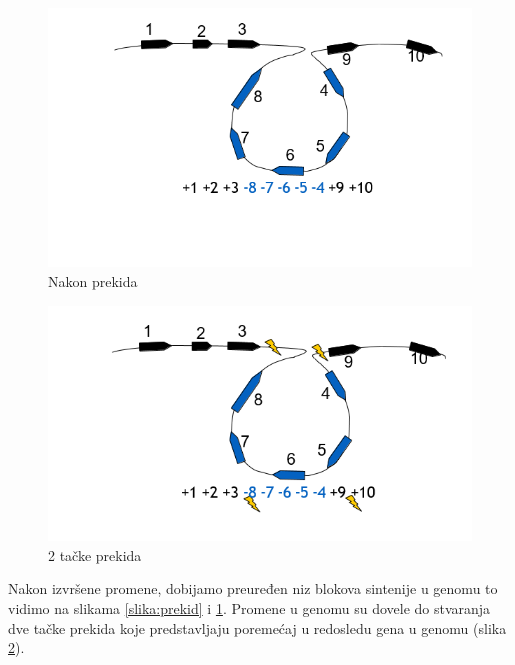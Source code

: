 \begin{minipage}{\textwidth}
	\centering
	\begin{minipage}{0.45\textwidth} 
		\begin{figure}[H]
			\centering
			\includegraphics[width=\textwidth]{poglavlja/6/slike/promene3.PNG}
			\caption{Nakon prekida}
			\label{slika:nakon promene}
		\end{figure}
	\end{minipage}
	\hfill 
	\begin{minipage}{0.45\textwidth}
		\begin{figure}[H]
			\centering
			\includegraphics[width=\textwidth]{poglavlja/6/slike/promene4.PNG}
			\caption{2 tačke prekida}
			\label{slika: 2 tačke prekida}
		\end{figure}
		
	\end{minipage}
	\vspace*{1em}
\end{minipage}




Nakon izvršene promene, dobijamo preuređen niz blokova sintenije u genomu to vidimo na slikama \ref{slika:prekid} i \ref{slika:nakon promene}. Promene u genomu su dovele do stvaranja dve tačke prekida koje predstavljaju poremećaj u redosledu gena u genomu (slika \ref{slika: 2 tačke prekida}).\\

